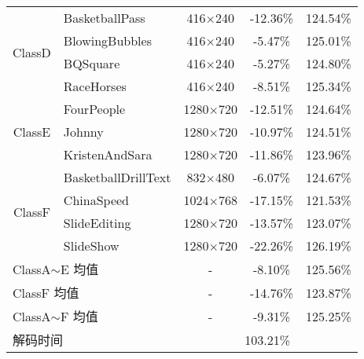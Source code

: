 \begin{table}[htb]
\begin{tabular}{@{}clccc@{}}
        \multirow{4}{*}{ClassD}                & BasketballPass               & 416$\times$240   & -12.36\% & 124.54\% \\
                                               & BlowingBubbles               & 416$\times$240   & -5.47\%  & 125.01\% \\
                                               & BQSquare                     & 416$\times$240   & -5.27\%  & 124.80\% \\
                                               & RaceHorses                   & 416$\times$240   & -8.51\%  & 125.34\% \\
        \multirow{3}{*}{ClassE}                & FourPeople                   & 1280$\times$720  & -12.51\% & 124.64\% \\
                                               & Johnny                       & 1280$\times$720  & -10.97\% & 124.51\% \\
                                               & KristenAndSara               & 1280$\times$720  & -11.86\% & 123.96\% \\
        \multirow{4}{*}{ClassF}                & BasketballDrillText          & 832$\times$480   & -6.07\%  & 124.67\% \\
                                               & ChinaSpeed                   & 1024$\times$768  & -17.15\% & 121.53\% \\
                                               & SlideEditing                 & 1280$\times$720  & -13.57\% & 123.07\% \\
                                               & SlideShow                    & 1280$\times$720  & -22.26\% & 126.19\% \\ \midrule
        \multicolumn{2}{l}{ClassA$\sim$E 均值} & -                            & -8.10\%          & 125.56\%            \\ \midrule
        \multicolumn{2}{l}{ClassF 均值}        & -                            & -14.76\%         & 123.87\%            \\ \midrule
        \multicolumn{2}{l}{ClassA$\sim$F 均值} & -                            & -9.31\%          & 125.25\%            \\ \midrule
        \multicolumn{2}{l}{解码时间}           & \multicolumn{3}{c}{103.21\%}                                          \\ \bottomrule
    \end{tabular}
\end{table}

